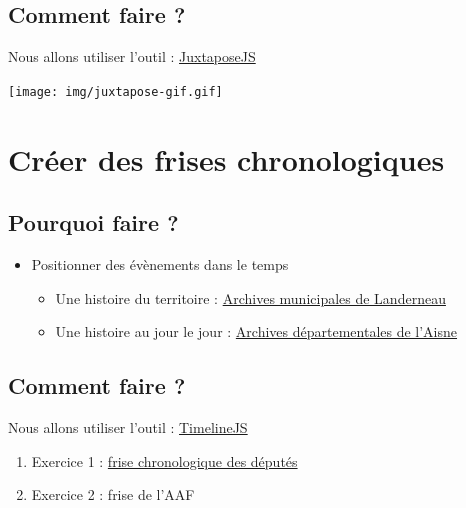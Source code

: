 \documentclass[
  letterpaper,
  DIV=11,
  numbers=noendperiod]{scrartcl}
\begin{document}
\subsection{Comment faire ?}\label{comment-faire}

Nous allons utiliser l'outil :
\href{https://juxtapose.knightlab.com/}{JuxtaposeJS}

\begin{center}
\texttt{[image: img/juxtapose-gif.gif]}
\end{center}

\section{Créer des frises
chronologiques}\label{cruxe9er-des-frises-chronologiques}

\subsection{Pourquoi faire ?}\label{pourquoi-faire-1}

\begin{itemize}
\item
  Positionner des évènements dans le temps

  \begin{itemize}
  \item
    Une histoire du territoire :
    \href{https://patrimoine.landerneau.bzh/chronologie/histoire-de-landerneau-10/n:64}{Archives
    municipales de Landerneau}
  \item
    Une histoire au jour le jour :
    \href{https://archives.aisne.fr/chronologies/n:134}{Archives
    départementales de l'Aisne}
  \end{itemize}
\end{itemize}

\subsection{Comment faire ?}\label{comment-faire-1}

Nous allons utiliser l'outil :
\href{https://timeline.knightlab.com/}{TimelineJS}

\begin{enumerate}
\def\labelenumi{\arabic{enumi}.}
\item
  Exercice 1 :
  \href{https://cdn.knightlab.com/libs/timeline3/latest/embed/index.html?source=14iK4j7BjoIyALvg4GhgJpOQD9MlAo0iAp72Byl_LYJc&font=Default&lang=en&initial_zoom=2&height=650}{frise
  chronologique des députés}
\item
  Exercice 2 : frise de l'AAF
\end{enumerate}
\end{document}
